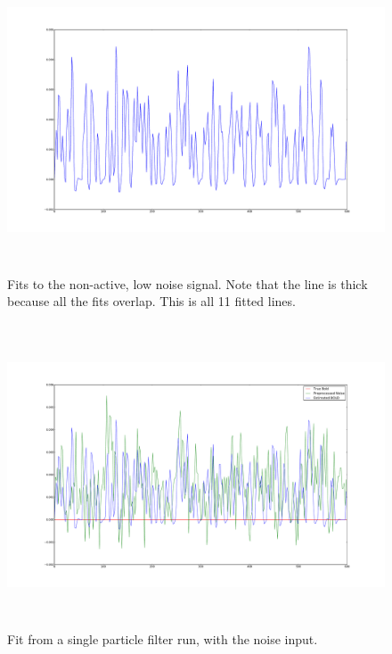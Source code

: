 \begin{figure}[H]
\centering
\includegraphics[clip=true,trim=6cm 3cm 6cm 3cm,height=9cm]{images/fits_noiseonly}
\caption{Fits to the non-active, low noise signal. Note that the line is thick because all
the fits overlap. This is all 11 fitted lines.}
\label{fig:fits_noiseonly}
\end{figure}

\begin{figure}[H]
\centering
\includegraphics[clip=true,trim=6cm 3cm 6cm 3cm,height=9cm]{images/justnoise_fit_0}
\caption{Fit from a single particle filter run, with the noise input. }
\label{fig:justnoise_fit_0}
\end{figure} %

